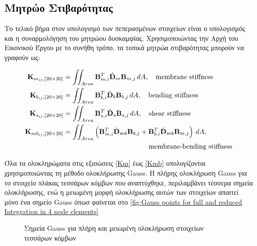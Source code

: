 \subsection{Μητρώο Στιβαρότητας }\label{stiffness-matrix}

Το τελικό βήμα στον υπολογισμό των πεπερασμένων στοιχείων είναι ο υπολογισμός και η συναρμολόγηση του μητρώου δυσκαμψίας. Χρησιμοποιώντας την Αρχή του Εικονικού Έργου με το συνήθη τρόπο, τα τοπικά μητρώα στιβαρότητας μπορούν να γραφούν ως:

\foreignlanguage{english}{
\begin{align}
  \mathbf{K}_{m_{ij}, [20 \times 20]} &= \iint_{Area} \mathbf{B}_{m,i}^{T}{\hat{\mathbf{D}}}_{m} \mathbf{B}_{m,j} \, dA, \quad \text{membrane stiffness} \label{Km} \\
  \mathbf{K}_{b_{ij}, [20 \times 20]} &= \iint_{Area} \mathbf{B}_{b,i}^{T}{\hat{\mathbf{D}}}_{b} \mathbf{B}_{b,j} \, dA, \quad \text{bending stiffness} \label{Kb}\\
  \mathbf{K}_{s_{ij}, [20 \times 20]} &= \iint_{Area} \mathbf{B}_{s,i}^{T}{\hat{\mathbf{D}}}_{s} \mathbf{B}_{s,j} \, dA, \quad \text{shear stiffness} \label{Ks}\\
  \mathbf{K}_{mb_{ij}, [20 \times 20]} &= \iint_{Area} \left( \mathbf{B}_{m,i}^{T}{\hat{\mathbf{D}}}_{mb} \mathbf{B}_{b,j} + \mathbf{B}_{b,i}^{T}{\hat{\mathbf{D}}}_{mb} \mathbf{B}_{m,j} \right) \, dA, \notag \\
  &\quad \hspace{4cm} \text{membrane-bending stiffness} \label{Kmb}
\end{align}
}

Όλα τα ολοκληρώματα στις εξισώσεις \eqref{Km} έως \eqref{Kmb} υπολογίζονται χρησιμοποιώντας τη μέθοδο ολοκλήρωσης \textlatin{Gauss}. Η πλήρης ολοκλήρωση \textlatin{Gauss} για το στοιχείο πλάκας τεσσάρων κόμβων που αναπτύχθηκε, περιλαμβάνει τέσσερα σημεία ολοκλήρωσης, ενώ η μειωμένη μορφή ολοκλήρωσης αυτών των στοιχείων απαιτεί μόνο ένα σημείο \textlatin{Gauss} όπωσ φαίνεται στο \autoref{fig:Gauss points for full and reduced Integration in 4 node elements}

\begin{figure}
    \centering
    
    \caption{Σημεία \textlatin{Gauss} για πλήρη και μειωμένη ολοκλήρωση στοιχείων τεσσάρων κόμβων}
    \label{fig:Gauss points for full and reduced Integration in 4 node elements}
\end{figure}


